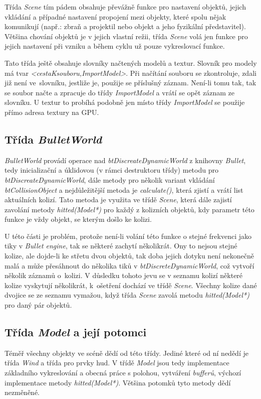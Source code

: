 Třída \emph{Scene} tím pádem obsahuje převážně funkce pro nastavení objektů, jejich vkládání a případné nastavení propojení mezi objekty, které spolu nějak komunikují (např.: zbraň a projektil nebo objekt a jeho fyzikální představitel). Většina chování objektů je v jejich vlastní režii, třída \emph{Scene} volá jen funkce pro jejich nastavení při vzniku a během cyklu už pouze vykreslovací funkce.  

Tato třída ještě obsahuje slovníky načtených modelů a textur. Slovník pro modely má tvar \emph{<cestaKsouboru,ImportModel>}. Při načítání souboru se zkontroluje, zdali již není ve~slovníku, jestliže je, použije se příslušný záznam. Není-li tomu tak, tak se soubor načte a zpracuje do třídy \emph{ImportModel} a vrátí se opět záznam ze slovníku. U textur to probíhá podobně jen místo třídy \emph{ImportModel} se použije přímo adresa textury na GPU.
\subsection{Třída \emph{BulletWorld}}
\emph{BulletWorld} provádí operace nad \emph{btDiscreateDynamicWorld} z knihovny \emph{Bullet}\cite{bullet}, tedy inicializační a úklidovou (v rámci destruktoru třídy) metodu pro \emph{btDiscreateDynamicWorld}, dále metody pro několik variant vkládání \emph{btCollisionObject}
a nejdůležitější metoda je \emph{calculate()}, která zjistí a vrátí list aktuálních kolizí. Tato metoda je využita ve třídě \emph{Scene}, která dále zajistí zavolání metody \emph{hitted(Model*)} pro každý z kolizních objektů, kdy parametr této funkce je vždy objekt, se kterým došlo ke kolizi. 

U této části je problém, protože není-li volání této funkce o stejné frekvenci jako tiky v \emph{Bullet engine}, tak se některé  zachytí několikrát. Ony to nejsou stejné kolize, ale dojde-li ke střetu dvou objektů, tak doba jejich dotyku není nekonečně malá a může přesáhnout do několika tiků v \emph{btDiscreteDynamicWorld}, což vytvoří několik záznamů o~kolizi.
V důsledku tohoto jevu se v seznamu kolizí některé kolize vyskytují několikrát, k~ošetření dochází ve třídě \emph{ Scene}. Všechny kolize dané dvojice se ze seznamu vymažou, když třída \emph{Scene} zavolá metodu \emph{hitted(Model*)} pro daný pár objektů.
\subsection{Třída \emph{Model} a její potomci}
Téměř všechny objekty ve scéně dědí od této třídy. Jediné které od ní nedědí je třída \emph{Wind} a třída pro prvky hud. V třídě \emph{Model} jsou tedy implementace základního vykreslování a obecná práce s polohou, vytváření \emph{bufferů}, výchozí implementace metody \emph{hitted(Model*)}. Většina potomků tyto metody dědí nezměněné.

